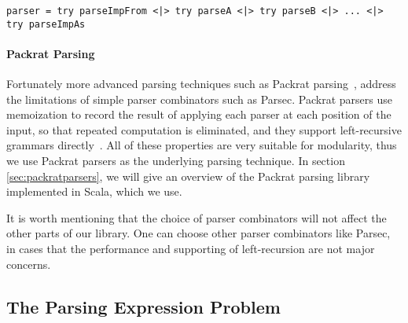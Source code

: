 \begin{lstlisting}[language=PlainCode]
parser = try parseImpFrom <|> try parseA <|> try parseB <|> ... <|> try parseImpAs
\end{lstlisting}


\paragraph{Packrat Parsing}
Fortunately more advanced parsing techniques such as Packrat
parsing~\cite{Ford2002}, address the limitations of simple parser combinators
such as Parsec. Packrat parsers use
memoization to record the result of applying each parser at each
position of the input, so that repeated computation is eliminated, and
they support left-recursive grammars directly~\cite{warth2008}. All of these properties are very
suitable for modularity, thus we use Packrat parsers as the underlying
parsing technique. In section \ref{sec:packratparsers}, we will give
an overview of the Packrat parsing library implemented in Scala,
which we use.

It is worth mentioning that the choice of parser combinators will not
affect the other parts of our library. One can choose other parser
combinators like Parsec, in cases that the performance and supporting
of left-recursion are not major concerns.

\subsection{The Parsing Expression Problem}\label{subsec:overview-problem}


